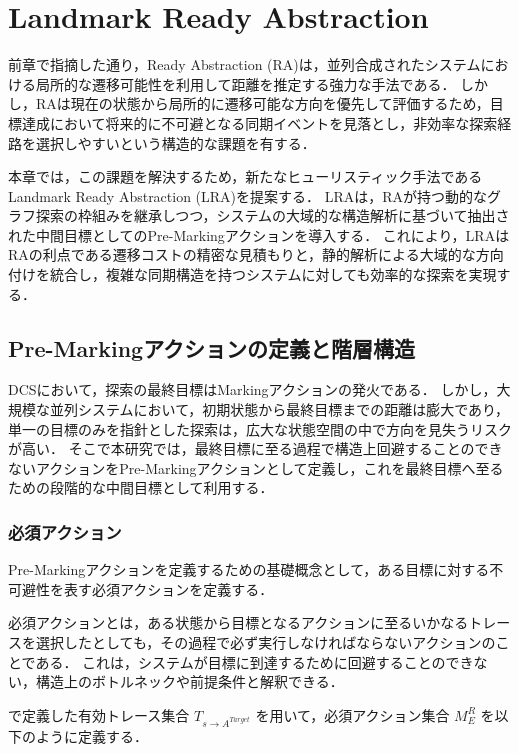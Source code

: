 \documentclass[a4paper,11pt,oneside,openany,report,dvipdfmx]{jsbook}
\newcommand\aref[1]{\hyperref[#1]{\prettyref{#1}}}
\begin{document}
\chapter{Landmark Ready Abstraction}
\label{chap:landmark_ready_abstraction}

前章で指摘した通り，Ready Abstraction (RA)は，並列合成されたシステムにおける局所的な遷移可能性を利用して距離を推定する強力な手法である．
しかし，RAは現在の状態から局所的に遷移可能な方向を優先して評価するため，目標達成において将来的に不可避となる同期イベントを見落とし，非効率な探索経路を選択しやすいという構造的な課題を有する．

本章では，この課題を解決するため，新たなヒューリスティック手法であるLandmark Ready Abstraction (LRA)を提案する．
LRAは，RAが持つ動的なグラフ探索の枠組みを継承しつつ，システムの大域的な構造解析に基づいて抽出された中間目標としてのPre-Markingアクションを導入する．
これにより，LRAはRAの利点である遷移コストの精密な見積もりと，静的解析による大域的な方向付けを統合し，複雑な同期構造を持つシステムに対しても効率的な探索を実現する．

\section{Pre-Markingアクションの定義と階層構造}

DCSにおいて，探索の最終目標はMarkingアクションの発火である．
しかし，大規模な並列システムにおいて，初期状態から最終目標までの距離は膨大であり，単一の目標のみを指針とした探索は，広大な状態空間の中で方向を見失うリスクが高い．
そこで本研究では，最終目標に至る過程で構造上回避することのできないアクションをPre-Markingアクションとして定義し，これを最終目標へ至るための段階的な中間目標として利用する．

\subsection{必須アクション}

Pre-Markingアクションを定義するための基礎概念として，ある目標に対する不可避性を表す必須アクションを定義する．

必須アクションとは，ある状態から目標となるアクションに至るいかなるトレースを選択したとしても，その過程で必ず実行しなければならないアクションのことである．
これは，システムが目標に到達するために回避することのできない，構造上のボトルネックや前提条件と解釈できる．

\aref{chap:background}で定義した有効トレース集合 $T_{s \to A^\mathit{Target}}$ を用いて，必須アクション集合 $M^R_E$ を以下のように定義する．
\end{document}
